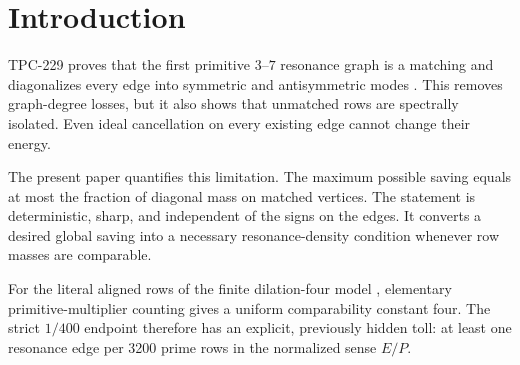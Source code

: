 \section{Introduction}

TPC-229 proves that the first primitive $3$--$7$ resonance graph is a matching and
diagonalizes every edge into symmetric and antisymmetric modes \cite{tpc229}.  This
removes graph-degree losses, but it also shows that unmatched rows are spectrally
isolated.  Even ideal cancellation on every existing edge cannot change their energy.

The present paper quantifies this limitation.  The maximum possible saving equals at
most the fraction of diagonal mass on matched vertices.  The statement is deterministic,
sharp, and independent of the signs on the edges.  It converts a desired global saving
into a necessary resonance-density condition whenever row masses are comparable.

For the literal aligned rows of the finite dilation-four model \cite{tpc226}, elementary
primitive-multiplier counting gives a uniform comparability constant four.  The strict
$1/400$ endpoint therefore has an explicit, previously hidden toll: at least one
resonance edge per 3200 prime rows in the normalized sense $E/P$.
